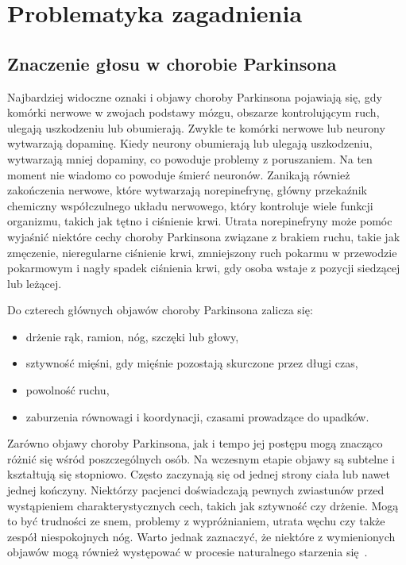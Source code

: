 \chapter{Problematyka zagadnienia}
\label{ch:problematyka}


\section{Znaczenie głosu w chorobie Parkinsona}
\label{sec:znaczenie_glosu}

Najbardziej widoczne oznaki i objawy choroby Parkinsona pojawiają się, gdy komórki nerwowe w zwojach podstawy mózgu,
obszarze kontrolującym ruch, ulegają uszkodzeniu lub obumierają.
Zwykle te komórki nerwowe lub neurony wytwarzają dopaminę.
Kiedy neurony obumierają lub ulegają uszkodzeniu, wytwarzają mniej dopaminy, co powoduje problemy z poruszaniem.
Na ten moment nie wiadomo co powoduje śmierć neuronów.
Zanikają również zakończenia nerwowe, które wytwarzają norepinefrynę, główny przekaźnik chemiczny
współczulnego układu nerwowego, który kontroluje wiele funkcji organizmu, takich jak tętno i ciśnienie krwi.
Utrata norepinefryny może pomóc wyjaśnić niektóre cechy choroby Parkinsona związane z brakiem ruchu, takie jak zmęczenie,
nieregularne ciśnienie krwi, zmniejszony ruch pokarmu w przewodzie pokarmowym i nagły spadek ciśnienia krwi, gdy osoba wstaje z pozycji siedzącej lub leżącej.

\vspace{0.5cm}
Do czterech głównych objawów choroby Parkinsona zalicza się:
\begin{itemize}[itemsep=0.05pt]
	\item drżenie rąk, ramion, nóg, szczęki lub głowy,
	\item sztywność mięśni, gdy mięśnie pozostają skurczone przez długi czas,
	\item powolność ruchu,
	\item zaburzenia równowagi i koordynacji, czasami prowadzące do upadków.
\end{itemize}

Zarówno objawy choroby Parkinsona, jak i tempo jej postępu mogą znacząco różnić się wśród poszczególnych osób.
Na wczesnym etapie objawy są subtelne i kształtują się stopniowo.
Często zaczynają się od jednej strony ciała lub nawet jednej kończyny.
Niektórzy pacjenci doświadczają pewnych zwiastunów przed wystąpieniem charakterystycznych cech, takich jak sztywność czy drżenie.
Mogą to być trudności ze snem, problemy z wypróżnianiem, utrata węchu czy także zespół niespokojnych nóg.
Warto jednak zaznaczyć, że niektóre z wymienionych objawów mogą również występować w procesie naturalnego starzenia się~\cite{National_Institute_on_Aging_2022}.

